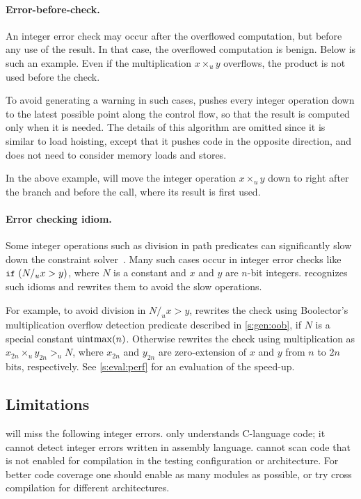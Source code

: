 \paragraph{Error-before-check.}
An integer error check may occur after the overflowed computation,
but before any use of the result.  In that case, the overflowed
computation is benign.  Below is such an example.  Even if the
multiplication $x \times_u y$ overflows, the product  is
not used before the check.


To avoid generating a warning in such cases, \sys pushes every
integer operation down to the latest possible point along the control
flow, so that the result is computed only when it is needed.  The
details of this algorithm are omitted since it is similar to load
hoisting, except that it pushes code in the opposite direction, and
does not need to consider memory loads and stores.

In the above example, \sys will move the integer operation $x
\times_u y$ down to right after the  branch and before the
 call, where its result  is first used.

\paragraph{Error checking idiom.}

Some integer operations such as division in path predicates can
significantly slow down the constraint solver~\cite{brummayer:perf}.
Many such cases occur in integer error checks like $\cc{if}\ (N /_u
x > y)$, where $N$ is a constant and $x$ and $y$ are $n$-bit integers.
\sys recognizes such idioms and rewrites them to avoid the slow
operations.

For example, to avoid division in $N /_u x > y$, \sys rewrites the check using
Boolector's multiplication overflow detection predicate described
in \autoref{s:gen:oob}, if $N$ is a special constant $\operatorname{uintmax}(n)$.
Otherwise \sys rewrites the check using multiplication as $x_{2n}
\times_u y_{2n} >_u N$, where $x_{2n}$ and $y_{2n}$ are zero-extension
of $x$ and $y$ from $n$ to $2n$ bits, respectively.
%
See \autoref{s:eval:perf} for an evaluation of the speed-up.

\subsection{Limitations}
\label{s:gen:limit}

\sys will miss the following integer errors.
%
\sys only understands C-language code; it cannot detect integer
errors written in assembly language.
%
\sys cannot scan code that is not enabled for compilation in the
testing configuration or architecture.  For better code coverage
one should enable as many modules as possible, or try cross compilation
for different architectures.

